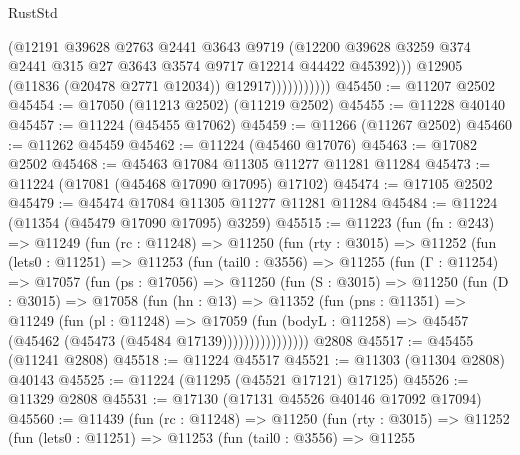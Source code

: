 \begin{lexlean}{RustStd}
\begin{coremodule}
                            (@12191
                              @39628
                              @2763
                              @2441
                              @3643
                              @9719
                              (@12200
                                @39628
                                @3259
                                @374
                                @2441
                                @315
                                @27
                                @3643
                                @3574
                                @9717
                                @12214
                                @44422
                                @45392)))
                          @12905
                          (@11836 (@20478 @2771 @12034))
                          @12917)))))))))))
@45450 := @11207 @2502
@45454 := @17050 (@11213 @2502) (@11219 @2502)
@45455 := @11228 @40140
@45457 := @11224 (@45455 @17062)
@45459 := @11266 (@11267 @2502)
@45460 := @11262 @45459
@45462 := @11224 (@45460 @17076)
@45463 := @17082 @2502
@45468 := @45463 @17084 @11305 @11277 @11281 @11284
@45473 := @11224 (@17081 (@45468 @17090 @17095) @17102)
@45474 := @17105 @2502
@45479 := @45474 @17084 @11305 @11277 @11281 @11284
@45484 := @11224 (@11354 (@45479 @17090 @17095) @3259)
@45515 := @11223
    (fun (fn : @243) =>
    @11249
      (fun (rc : @11248) =>
      @11250
        (fun (rty : @3015) =>
        @11252
          (fun (lets0 : @11251) =>
          @11253
            (fun (tail0 : @3556) =>
            @11255
              (fun (Γ : @11254) =>
              @17057
                (fun (ps : @17056) =>
                @11250
                  (fun (S : @3015) =>
                  @11250
                    (fun (D : @3015) =>
                    @17058
                      (fun (hn : @13) =>
                      @11352
                        (fun (pns : @11351) =>
                        @11249
                          (fun (pl : @11248) =>
                          @17059
                            (fun (bodyL : @11258) =>
                            @45457 (@45462 (@45473 (@45484 @17139))))))))))))))))
    @2808
@45517 := @45455 (@11241 @2808)
@45518 := @11224 @45517
@45521 := @11303 (@11304 @2808) @40143
@45525 := @11224 (@11295 (@45521 @17121) @17125)
@45526 := @11329 @2808
@45531 := @17130 (@17131 @45526 @40146 @17092 @17094)
@45560 := @11439
    (fun (rc : @11248) =>
    @11250
      (fun (rty : @3015) =>
      @11252
        (fun (lets0 : @11251) =>
        @11253
          (fun (tail0 : @3556) =>
          @11255

\end{coremodule}
\end{lexlean}
